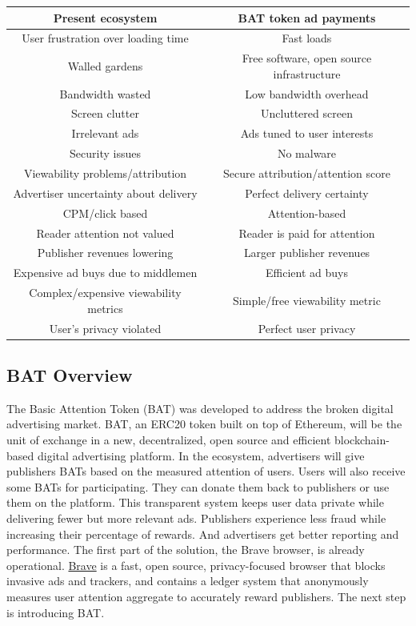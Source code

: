 \documentclass[11pt]{article}
\begin{document}
\begin{tabu}  to  \textwidth {|c|c|} \hline

{\textbf{Present ecosystem}} & {\textbf{BAT token ad payments}} \\  \hline

User frustration over loading time & Fast loads\\ %
Walled gardens & Free software, open source infrastructure\\ %
Bandwidth wasted & Low bandwidth overhead\\ %
Screen clutter & Uncluttered screen \\ %
Irrelevant ads & Ads tuned to user interests \\ %
Security issues & No malware \\ %
Viewability problems/attribution & Secure attribution/attention score\\ %
Advertiser uncertainty about delivery & Perfect delivery certainty \\ %
CPM/click based & Attention-based \\ %
Reader attention not valued & Reader is paid for attention \\ %
Publisher revenues lowering & Larger publisher revenues \\ %
Expensive ad buys due to middlemen & Efficient ad buys \\ %
Complex/expensive viewability metrics & Simple/free viewability metric \\ %
User's privacy violated & Perfect user privacy \\ \hline
\end{tabu}


\subsection{BAT Overview}
\label{sec-5-3}


The Basic Attention Token (BAT) was developed to address the broken digital advertising market. BAT, an ERC20 token built on top of Ethereum, will be the unit of exchange in a new, decentralized, open source and efficient blockchain-based digital advertising platform. In the ecosystem, advertisers will give publishers BATs based on the measured attention of users. Users will also receive some BATs for participating. They can donate them back to publishers or use them on the platform. This transparent system keeps user data private while delivering fewer but more relevant ads. Publishers experience less fraud while increasing their percentage of rewards. And advertisers get better reporting and performance. The first part of the solution, the Brave browser, is already operational. \href{https://brave.com/}{Brave} is a fast, open source, privacy-focused browser that blocks invasive ads and trackers, and contains a ledger system that anonymously measures user attention aggregate to accurately reward publishers. The next step is introducing BAT.
\end{document}
